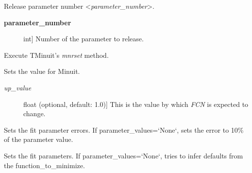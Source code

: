\documentclass[a4paper,10pt,english]{sphinxmanual}
\begin{document}
\begin{fulllineitems}
\begin{fulllineitems}
\label{index:kafe.minuit.Minuit.release_parameter}
Release parameter number \textless{}\emph{parameter\_number}\textgreater{}.
\begin{description}
\item[{\textbf{parameter\_number}}] \leavevmode{[}int{]}
Number of the parameter to release.

\end{description}

\end{fulllineitems}


\begin{fulllineitems}
\label{index:kafe.minuit.Minuit.reset}
Execute TMinuit's \emph{mnrset} method.

\end{fulllineitems}


\begin{fulllineitems}
\label{index:kafe.minuit.Minuit.set_err}
Sets the  value for Minuit.
\begin{description}
\item[{\emph{up\_value}}] \leavevmode{[}float (optional, default: 1.0){]}
This is the value by which \emph{FCN} is expected to change.

\end{description}

\end{fulllineitems}


\begin{fulllineitems}
\label{index:kafe.minuit.Minuit.set_parameter_errors}
Sets the fit parameter errors. If parameter\_values={}`None{}`, sets the
error to 10\% of the parameter value.

\end{fulllineitems}


\begin{fulllineitems}
\label{index:kafe.minuit.Minuit.set_parameter_names}
Sets the fit parameters. If parameter\_values={}`None{}`, tries to infer
defaults from the function\_to\_minimize.


\end{fulllineitems}
\end{fulllineitems}
\end{document}
